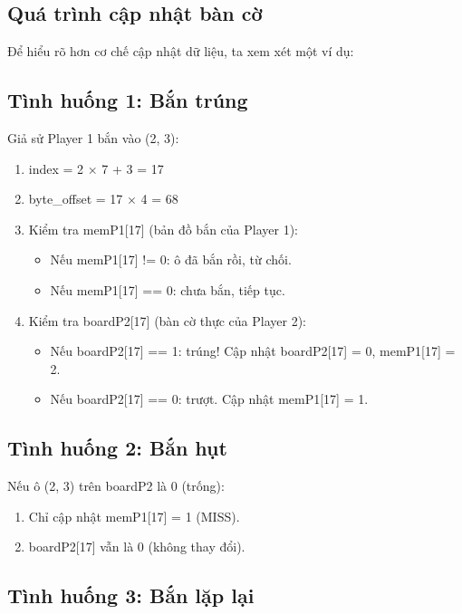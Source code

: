\subsection{Quá trình cập nhật bàn cờ}

Để hiểu rõ hơn cơ chế cập nhật dữ liệu, ta xem xét một ví dụ:

\subsection{Tình huống 1: Bắn trúng}

Giả sử Player 1 bắn vào (2, 3):
\begin{enumerate}
    \item index = 2 × 7 + 3 = 17
    \item byte\_offset = 17 × 4 = 68
    \item Kiểm tra memP1[17] (bản đồ bắn của Player 1):
    \begin{itemize}
        \item Nếu memP1[17] != 0: ô đã bắn rồi, từ chối.
        \item Nếu memP1[17] == 0: chưa bắn, tiếp tục.
    \end{itemize}
    \item Kiểm tra boardP2[17] (bàn cờ thực của Player 2):
    \begin{itemize}
        \item Nếu boardP2[17] == 1: trúng! Cập nhật boardP2[17] = 0, memP1[17] = 2.
        \item Nếu boardP2[17] == 0: trượt. Cập nhật memP1[17] = 1.
    \end{itemize}
\end{enumerate}

\subsection{Tình huống 2: Bắn hụt}

Nếu ô (2, 3) trên boardP2 là 0 (trống):
\begin{enumerate}
    \item Chỉ cập nhật memP1[17] = 1 (MISS).
    \item boardP2[17] vẫn là 0 (không thay đổi).
\end{enumerate}

\subsection{Tình huống 3: Bắn lặp lại}

